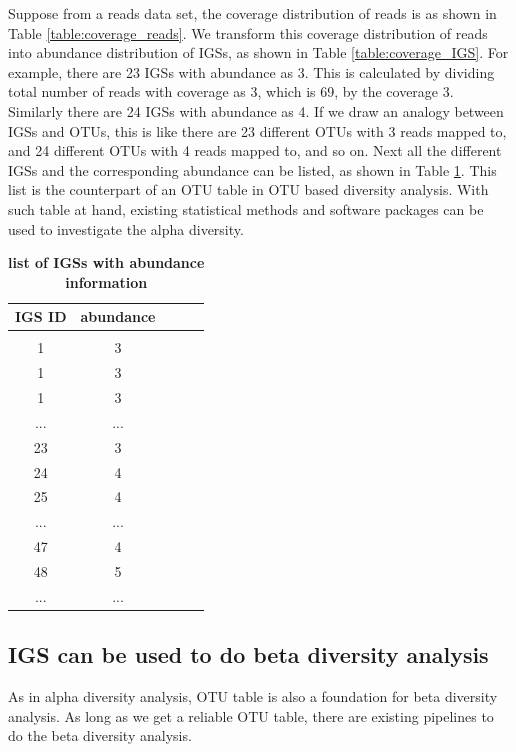 Suppose from a reads data set, the coverage distribution of reads is as 
shown in Table \ref{table:coverage_reads}. We transform this coverage distribution
of reads into abundance distribution of IGSs, as shown in Table \ref{table:coverage_IGS}.
For example, there are 23 IGSs with abundance as 3. This is calculated by dividing  
total number of reads with coverage as 3, which is 69, by the coverage 3.
Similarly there are 24 IGSs with abundance as 4. 
If we draw an analogy between IGSs and OTUs, this is like there are 23 
different OTUs with 3 reads mapped to, and 24 different OTUs with 4 reads mapped to, and so on.
Next all the different IGSs and the corresponding abundance can be listed,
as shown in Table \ref{table:list_IGS}. This list is the counterpart of an 
OTU table in OTU based diversity analysis.
With such table at hand, existing statistical methods and software 
packages can be used to investigate the alpha diversity.  


\begin{table}[!ht]
\caption{
\bf{list of IGSs with abundance information}
}
\begin{tabular}{ |c | c |c| c|c| }
IGS ID & abundance \\
\hline \\
1                   & 3  \\
1                 & 3  \\
1                  & 3 \\
...        & ... \\
23        & 3 \\
24        & 4 \\
25        & 4 \\
...        & ... \\
47        & 4 \\
48        & 5 \\
...        & ... \\
\end{tabular}
\begin{flushleft}
\end{flushleft}
\label{table:list_IGS}
\end{table}




\subsection{IGS can be used to do beta diversity analysis}

As in alpha diversity analysis, OTU table is also a foundation for beta 
diversity analysis. As long as we get a reliable OTU table, there are existing 
pipelines to do the beta diversity analysis. 

